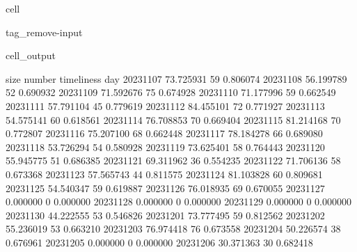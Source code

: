 \documentclass[letterpaper,10pt,english]{jupyterBook}
\begin{document}
\begin{sphinxuseclass}{cell}
\begin{sphinxuseclass}{tag_remove-input}\begin{sphinxVerbatimOutput}

\begin{sphinxuseclass}{cell_output}
\begin{sphinxVerbatim}[commandchars=\\\{\}]
                 size  number  timeliness
day                                      
2023\PYGZhy{}11\PYGZhy{}07  73.725931      59    0.806074
2023\PYGZhy{}11\PYGZhy{}08  56.199789      52    0.690932
2023\PYGZhy{}11\PYGZhy{}09  71.592676      75    0.674928
2023\PYGZhy{}11\PYGZhy{}10  71.177996      59    0.662549
2023\PYGZhy{}11\PYGZhy{}11  57.791104      45    0.779619
2023\PYGZhy{}11\PYGZhy{}12  84.455101      72    0.771927
2023\PYGZhy{}11\PYGZhy{}13  54.575141      60    0.618561
2023\PYGZhy{}11\PYGZhy{}14  76.708853      70    0.669404
2023\PYGZhy{}11\PYGZhy{}15  81.214168      70    0.772807
2023\PYGZhy{}11\PYGZhy{}16  75.207100      68    0.662448
2023\PYGZhy{}11\PYGZhy{}17  78.184278      66    0.689080
2023\PYGZhy{}11\PYGZhy{}18  53.726294      54    0.580928
2023\PYGZhy{}11\PYGZhy{}19  73.625401      58    0.764443
2023\PYGZhy{}11\PYGZhy{}20  55.945775      51    0.686385
2023\PYGZhy{}11\PYGZhy{}21  69.311962      36    0.554235
2023\PYGZhy{}11\PYGZhy{}22  71.706136      58    0.673368
2023\PYGZhy{}11\PYGZhy{}23  57.565743      44    0.811575
2023\PYGZhy{}11\PYGZhy{}24  81.103828      60    0.809681
2023\PYGZhy{}11\PYGZhy{}25  54.540347      59    0.619887
2023\PYGZhy{}11\PYGZhy{}26  76.018935      69    0.670055
2023\PYGZhy{}11\PYGZhy{}27   0.000000       0    0.000000
2023\PYGZhy{}11\PYGZhy{}28   0.000000       0    0.000000
2023\PYGZhy{}11\PYGZhy{}29   0.000000       0    0.000000
2023\PYGZhy{}11\PYGZhy{}30  44.222555      53    0.546826
2023\PYGZhy{}12\PYGZhy{}01  73.777495      59    0.812562
2023\PYGZhy{}12\PYGZhy{}02  55.236019      53    0.663210
2023\PYGZhy{}12\PYGZhy{}03  76.974418      76    0.673558
2023\PYGZhy{}12\PYGZhy{}04  50.226574      38    0.676961
2023\PYGZhy{}12\PYGZhy{}05   0.000000       0    0.000000
2023\PYGZhy{}12\PYGZhy{}06  30.371363      30    0.682418
\end{sphinxVerbatim}

\end{sphinxuseclass}\end{sphinxVerbatimOutput}

\end{sphinxuseclass}
\end{sphinxuseclass}
\sphinxstepscope
\end{document}
